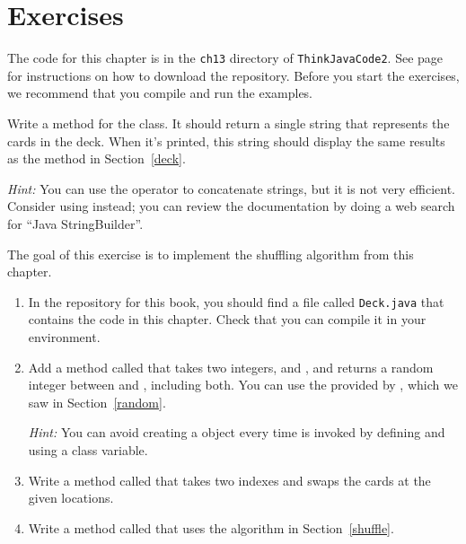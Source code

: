 \section{Exercises}

The code for this chapter is in the {\tt ch13} directory of {\tt ThinkJavaCode2}.
See page~\pageref{code} for instructions on how to download the repository.
Before you start the exercises, we recommend that you compile and run the examples.


\begin{exercise}  %

Write a  method for the  class.
It should return a single string that represents the cards in the deck.
When it's printed, this string should display the same results as the  method in Section~\ref{deck}.


{\it Hint:} You can use the \java{+} operator to concatenate strings, but it is not very efficient.
Consider using  instead; you can review the documentation by doing a web search for ``Java StringBuilder''.

\end{exercise}


\begin{exercise}  %
\label{ex.shuffle}

The goal of this exercise is to implement the shuffling algorithm from this chapter.

\begin{enumerate}

\item In the repository for this book, you should find a file called {\tt Deck.java} that contains the code in this chapter.
Check that you can compile it in your environment.

\item Add a  method called  that takes two integers,  and , and returns a random integer between  and , including both.
You can use the  provided by , which we saw in Section~\ref{random}.

{\it Hint:} You can avoid creating a  object every time  is invoked by defining and using a class variable.


\item Write a method called  that takes two indexes and swaps the cards at the given locations.

\item Write a method called  that uses the algorithm in Section~\ref{shuffle}.

\end{enumerate}

\end{exercise}



